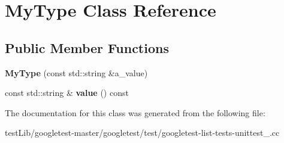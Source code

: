 \hypertarget{classMyType}{}\section{My\+Type Class Reference}
\label{classMyType}
\subsection*{Public Member Functions}
\begin{DoxyCompactItemize}
\item 
\mbox{\label{classMyType_a74d6f29a06e298321a6e5f0b91b020e7}} 
{\bfseries My\+Type} (const std\+::string \&a\+\_\+value)
\item 
\mbox{\label{classMyType_a04eaace57f0ecd8ee8898defbdee31b4}} 
const std\+::string \& {\bfseries value} () const
\end{DoxyCompactItemize}


The documentation for this class was generated from the following file\+:\begin{DoxyCompactItemize}
\item 
test\+Lib/googletest-\/master/googletest/test/googletest-\/list-\/tests-\/unittest\+\_\+.\+cc\end{DoxyCompactItemize}
